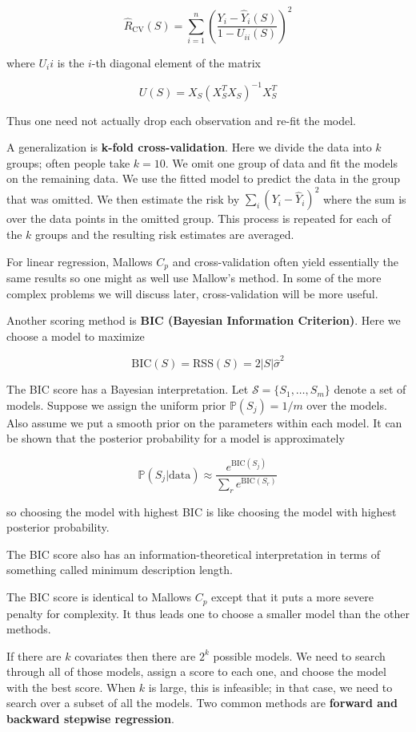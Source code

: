 \[\hat{R}_\text{CV}(S) = \sum_{i=1}^n \left( \frac{Y_i - \hat{Y}_i(S)}{1 - U_{ii}(S)} \right)^2 \]

where \(U_ii\) is the \(i\)-th diagonal element of the matrix

\[U(S) = X_S (X_S^T X_S)^{-1} X_S^T\]

Thus one need not actually drop each observation and re-fit the model.

A generalization is \textbf{k-fold cross-validation}. Here we divide the
data into \(k\) groups; often people take \(k = 10\). We omit one group
of data and fit the models on the remaining data. We use the fitted
model to predict the data in the group that was omitted. We then
estimate the risk by \(\sum_i (Y_i - \hat{Y}_i)^2\) where the sum is
over the data points in the omitted group. This process is repeated for
each of the \(k\) groups and the resulting risk estimates are averaged.

For linear regression, Mallows \(C_p\) and cross-validation often yield
essentially the same results so one might as well use Mallow's method.
In some of the more complex problems we will discuss later,
cross-validation will be more useful.

Another scoring method is \textbf{BIC (Bayesian Information Criterion)}.
Here we choose a model to maximize

\[ \text{BIC}(S) = \text{RSS}(S) = 2 |S| \hat{\sigma}^2 \]

The BIC score has a Bayesian interpretation. Let
\(\mathcal{S} = \{ S_1, \dots, S_m \}\) denote a set of models. Suppose
we assign the uniform prior \(\mathbb{P}(S_j) = 1 / m\) over the models.
Also assume we put a smooth prior on the parameters within each model.
It can be shown that the posterior probability for a model is
approximately

\[ \mathbb{P}(S_j | \text{data}) \approx \frac{e^{\text{BIC}(S_j)}}{\sum_r e^{\text{BIC}(S_r)}}\]

so choosing the model with highest BIC is like choosing the model with
highest posterior probability.

The BIC score also has an information-theoretical interpretation in
terms of something called minimum description length.

The BIC score is identical to Mallows \(C_p\) except that it puts a more
severe penalty for complexity. It thus leads one to choose a smaller
model than the other methods.

If there are \(k\) covariates then there are \(2^k\) possible models. We
need to search through all of those models, assign a score to each one,
and choose the model with the best score. When \(k\) is large, this is
infeasible; in that case, we need to search over a subset of all the
models. Two common methods are \textbf{forward and backward stepwise
regression}.

